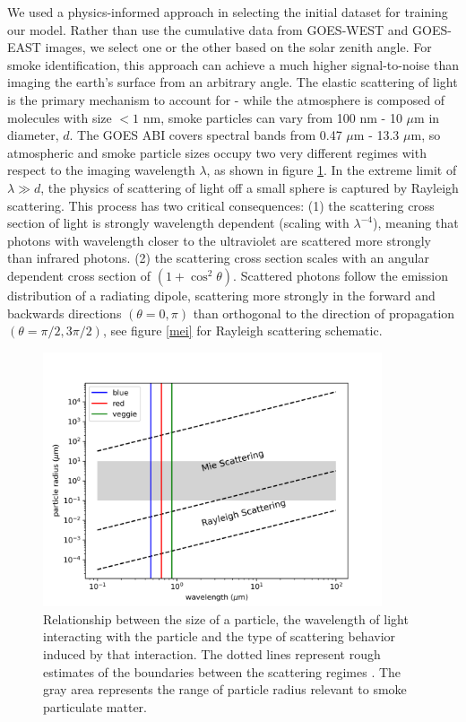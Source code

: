 \documentclass{ametsocV6.1}
\begin{document}
We used a physics-informed approach in selecting the initial dataset for training our model. Rather than use the cumulative data from GOES-WEST and GOES-EAST images, we select one or the other based on the solar zenith angle. For smoke identification, this approach can achieve a much higher signal-to-noise than imaging the earth’s surface from an arbitrary angle. The elastic scattering of light is the primary mechanism to account for - while the atmosphere is composed of molecules with size $<1$ nm, smoke particles can vary from 100 nm - 10 $\mu$m in diameter, $d$. The GOES ABI covers spectral bands from 0.47 $\mu$m - 13.3 $\mu$m, so atmospheric and smoke particle sizes occupy two very different regimes with respect to the imaging wavelength $\lambda$, as shown in figure \ref{regime}. In the extreme limit of $\lambda \gg d$, the physics of scattering of light off a small sphere is captured by Rayleigh scattering. This process has two critical consequences: (1) the scattering cross section of light is strongly wavelength dependent (scaling with $\lambda^{-4}$), meaning that photons with wavelength closer to the ultraviolet are scattered more strongly than infrared photons. (2) the scattering cross section scales with an angular dependent cross section of $(1 + \cos^2 \theta)$. Scattered photons follow the emission distribution of a radiating dipole, scattering more strongly in the forward and backwards directions $(\theta = 0,\pi)$ than orthogonal to the direction of propagation $(\theta = \pi/2, 3\pi/2)$, see figure \ref{mei} for Rayleigh scattering schematic.

\begin{figure}
    \centering
    \includegraphics[width=10cm]{figures/scatter_regime.png}
    \caption{Relationship between the size of a particle, the wavelength of light interacting with the particle and the type of scattering behavior induced by that interaction. The dotted lines represent rough estimates of the boundaries between the scattering regimes \citep{petty}. The gray area represents the range of particle radius relevant to smoke particulate matter.}\label{regime}
\end{figure}
\end{document}

